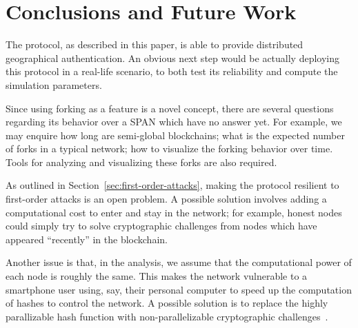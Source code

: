 \section{Conclusions and Future Work}


The protocol, as described in this paper,
is able to provide distributed geographical authentication.
An obvious next step would be actually deploying this protocol in a real-life scenario,
to both test its reliability and compute the simulation parameters.

Since using forking as a feature is a novel concept,
there are several questions regarding its behavior over a SPAN
which have no answer yet.
For example,
we may enquire how long are semi-global blockchains;
what is the expected number of forks in a typical network;
how to visualize the forking behavior over time.
Tools for analyzing and visualizing these forks are also required.

As outlined in Section~\ref{sec:first-order-attacks},
making the protocol resilient to first-order attacks is an open problem.
A possible solution involves adding a computational cost
to enter and stay in the network;
for example,
honest nodes could simply try to solve cryptographic challenges
from nodes which have appeared ``recently'' in the blockchain.

Another issue is that,
in the analysis,
we assume that the computational power of each node
is roughly the same.
This makes the network vulnerable to a smartphone user using,
say,
their personal computer to speed up the computation of hashes
to control the network.
A possible solution is to replace the highly parallizable hash function
with non-parallelizable cryptographic challenges~\cite{Tritilanunt2007}.
